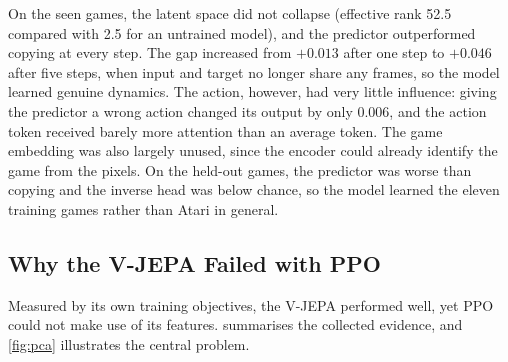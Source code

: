 \documentclass[runningheads]{llncs}
\begin{document}
On the seen games, the latent space did not collapse (effective rank 52.5 compared with 2.5 for
an untrained model), and the predictor outperformed copying at every step. The gap increased
from $+0.013$ after one step to $+0.046$ after five steps, when input and target no longer share any frames, so the model learned genuine dynamics. The action, however, had very little influence: giving the predictor a wrong action changed its output by
only 0.006, and the action token received barely more attention than an average token. The
game embedding was also largely unused, since the encoder could already identify the game from
the pixels. On the held-out games, the predictor was worse than copying and the inverse head was below
chance, so the model learned the eleven training games rather than Atari in general.

\subsection{Why the V-JEPA Failed with PPO}
\label{sec:jepa-fail}

Measured by its own training objectives, the V-JEPA performed well, yet PPO could not make use
of its features.  summarises the collected evidence, and \cref{fig:pca}
illustrates the central problem.
\end{document}
